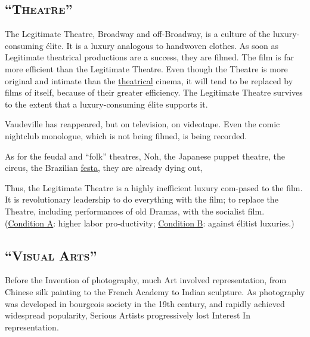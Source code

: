 
\subsection*{\enquote{\textsc{Theatre}}}
The Legitimate Theatre, Broadway and off-Broadway, is a culture of the luxury-consuming \'{e}lite. It is a luxury analogous to handwoven clothes. As soon as Legitimate theatrical productions are a success, they are filmed. The film is far more efficient than the Legitimate Theatre. Even though the Theatre is more original and intimate than the \uline{theatrical} cinema, it will tend to be replaced by films of itself, because of their greater efficiency. The Legitimate Theatre survives to the extent that a luxury-consuming \'{e}lite supports it. 

Vaudeville has reappeared, but on television, on videotape. Even the comic nightclub monologue, which is not being filmed, is being recorded. 

As for the feudal and \enquote{folk} theatres, Noh, the Japanese puppet theatre, the circus, the Brazilian \uline{festa}, they are already dying out, 

Thus, the Legitimate Theatre is a highly inefficient luxury com-pased to the film. It is revolutionary leadership to do everything with the film; to replace the Theatre, including performances of old Dramas, with the socialist film. (\uline{Condition A}: higher labor pro-ductivity; \uline{Condition B}: against \'{e}litist luxuries.) 

\subsection*{\enquote{\textsc{Visual Arts}}}
Before the Invention of photography, much Art involved representation, from Chinese silk painting to the French Academy to Indian sculpture. As photography was developed in bourgeois society in the 19th century, and rapidly achieved widespread popularity, Serious Artists progressively lost Interest In representation. 

